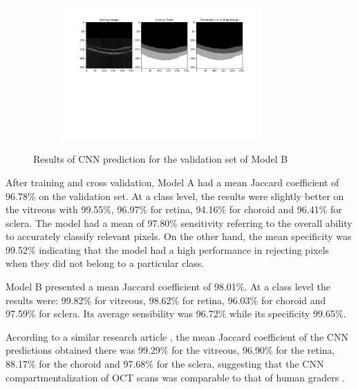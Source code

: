 \documentclass[12pt,a4paper]{scrartcl}
\begin{document}
\begin{figure}
\begin{subfigure}{1\textwidth}
    \includegraphics[trim= 100 250 80 0, clip, width=0.85\textwidth]{./images/results/B_syntethic_groundtruth_predictions29052021-081035.png}
    \caption{}
    \label{fig:results:B:c}
   \end{subfigure}
   \caption{Results of CNN prediction for the validation set of Model B}
  \label{fig:results_modelB}
\end{figure}

After training and cross validation, Model A had a mean Jaccard coefficient of 96.78\% on the validation set. At a class level, the results were slightly better on the vitreous with 99.55\%, 96.97\% for retina, 94.16\% for choroid and 96.41\% for sclera.
The model had a mean of 97.80\% sensitivity referring to the overall ability to accurately classify relevant pixels. On the other hand, the mean specificity was 99.52\% indicating that the model had a high performance in rejecting pixels when they did not belong to a particular class. 

Model B presented a mean Jaccard coefficient of 98.01\%. At a class level the results were: 99.82\% for vitreous, 98.62\% for retina, 96.03\% for choroid and 97.59\% for sclera. Its average sensibility was 96.72\% while its specificity 99.65\%.

According to a similar research article \cite{Maloca2019}, the mean Jaccard coefficient of the CNN predictions obtained there was 99.29\% for the vitreous, 96.90\% for the retina, 88.17\% for the choroid and 97.68\% for the sclera, suggesting that the CNN compartmentalization of OCT scans was comparable to that of human graders \cite{Maloca2019}. 
\end{document}
